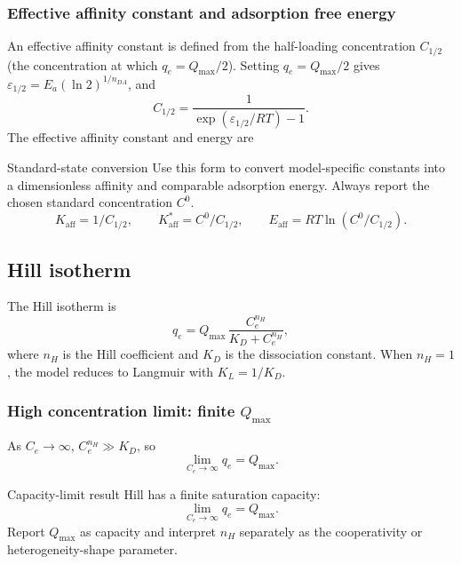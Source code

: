\documentclass[journal=jacsat,manuscript=article]{achemso}
\begin{document}
\subsubsection{Effective affinity constant and adsorption free energy}

An effective affinity constant is defined from the half-loading concentration $C_{1/2}$
(the concentration at which $q_e = Q_{\max}/2$).
Setting $q_e = Q_{\max}/2$ gives $\varepsilon_{1/2} = E_a(\ln 2)^{1/n_{DA}}$, and
\begin{equation}
	C_{1/2} = \frac{1}{\exp(\varepsilon_{1/2}/RT) - 1}.
\end{equation}
The effective affinity constant and energy are
\begin{greenbox}{Standard-state conversion}
	Use this form to convert model-specific constants into a dimensionless affinity and comparable adsorption energy. Always report the chosen standard concentration \(C^0\).
\begin{equation}
	K_{\mathrm{aff}} = 1/C_{1/2},
		\qquad
		K_{\mathrm{aff}}^{\ast} = C^0/C_{1/2},
		\qquad
		E_{\mathrm{aff}} = RT\ln(C^0/C_{1/2}).
\end{equation}
\end{greenbox}

\subsection{Hill isotherm}
\label{sec:si_hill}

The Hill isotherm is
\begin{equation}
	q_e = Q_{\max}\,\frac{C_e^{n_H}}{K_D + C_e^{n_H}},
	\label{eq:si_hill}
\end{equation}
where $n_H$ is the Hill coefficient and $K_D$ is the dissociation constant.
When $n_H = 1$, the model reduces to Langmuir with $K_L = 1/K_D$.

\subsubsection{High concentration limit: finite $Q_{\max}$}

As $C_e \to \infty$, $C_e^{n_H} \gg K_D$, so
\begin{equation}
	\lim_{C_e \to \infty} q_e = Q_{\max}.
\end{equation}
\begin{greenbox}{Capacity-limit result}
	Hill has a finite saturation capacity:
	\begin{equation}
		\lim_{C_e \to \infty} q_e = Q_{\max}.
	\end{equation}
	Report \(Q_{\max}\) as capacity and interpret \(n_H\) separately as the
	cooperativity or heterogeneity-shape parameter.
\end{greenbox}
\end{document}
